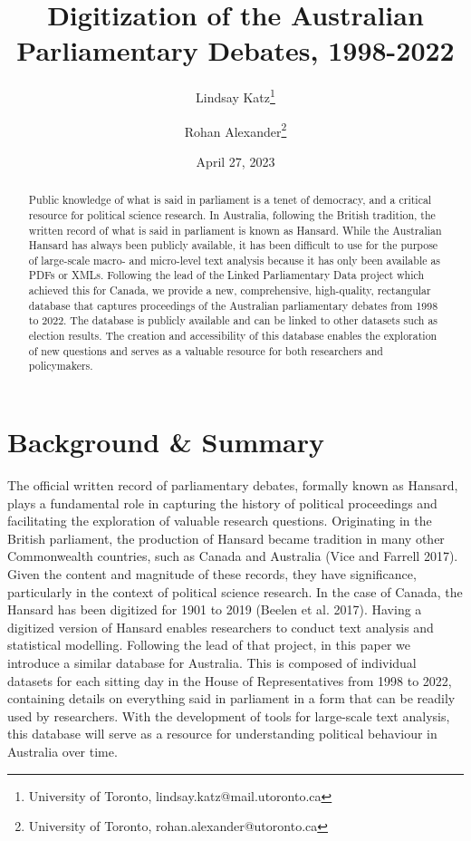 \documentclass[
  letterpaper,
  DIV=11,
  numbers=noendperiod]{scrartcl}
\title{Digitization of the Australian Parliamentary Debates, 1998-2022}
\author{Lindsay Katz\footnote{University of Toronto,
  lindsay.katz@mail.utoronto.ca} \and Rohan Alexander\footnote{University
  of Toronto, rohan.alexander@utoronto.ca}}
\date{April 27, 2023}
\begin{document}
\maketitle
\begin{abstract}
Public knowledge of what is said in parliament is a tenet of democracy,
and a critical resource for political science research. In Australia,
following the British tradition, the written record of what is said in
parliament is known as Hansard. While the Australian Hansard has always
been publicly available, it has been difficult to use for the purpose of
large-scale macro- and micro-level text analysis because it has only
been available as PDFs or XMLs. Following the lead of the Linked
Parliamentary Data project which achieved this for Canada, we provide a
new, comprehensive, high-quality, rectangular database that captures
proceedings of the Australian parliamentary debates from 1998 to 2022.
The database is publicly available and can be linked to other datasets
such as election results. The creation and accessibility of this
database enables the exploration of new questions and serves as a
valuable resource for both researchers and policymakers.
\end{abstract}
\ifdefined\Shaded\renewenvironment{Shaded}{\begin{tcolorbox}[borderline west={3pt}{0pt}{shadecolor}, enhanced, interior hidden, boxrule=0pt, sharp corners, frame hidden, breakable]}{\end{tcolorbox}}\fi

\hypertarget{sec-intro}{%
\section{Background \& Summary}\label{sec-intro}}

The official written record of parliamentary debates, formally known as
Hansard, plays a fundamental role in capturing the history of political
proceedings and facilitating the exploration of valuable research
questions. Originating in the British parliament, the production of
Hansard became tradition in many other Commonwealth countries, such as
Canada and Australia (Vice and Farrell 2017). Given the content and
magnitude of these records, they have significance, particularly in the
context of political science research. In the case of Canada, the
Hansard has been digitized for 1901 to 2019 (Beelen et al. 2017). Having
a digitized version of Hansard enables researchers to conduct text
analysis and statistical modelling. Following the lead of that project,
in this paper we introduce a similar database for Australia. This is
composed of individual datasets for each sitting day in the House of
Representatives from 1998 to 2022, containing details on everything said
in parliament in a form that can be readily used by researchers. With
the development of tools for large-scale text analysis, this database
will serve as a resource for understanding political behaviour in
Australia over time.
\end{document}
